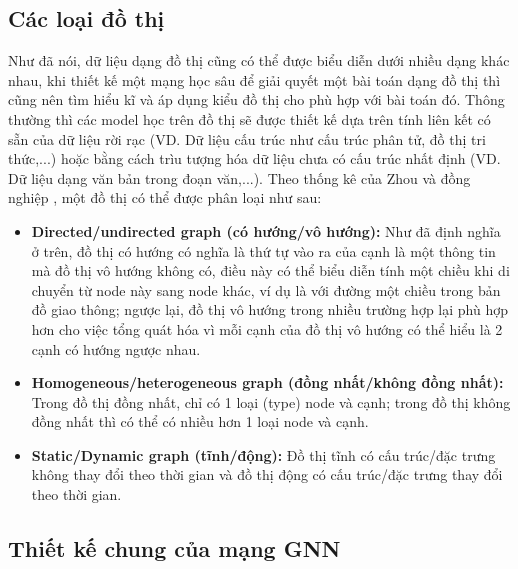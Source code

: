 \subsection{Các loại đồ thị}

\noindent Như đã nói, dữ liệu dạng đồ thị cũng có thể được biểu diễn dưới nhiều dạng khác nhau, khi thiết kế một mạng học sâu để giải quyết một bài toán dạng đồ thị thì cũng nên tìm hiểu kĩ và áp dụng kiểu đồ thị cho phù hợp với bài toán đó. Thông thường thì các model học trên đồ thị sẽ được thiết kế dựa trên tính liên kết có sẵn của dữ liệu rời rạc (VD. Dữ liệu cấu trúc như cấu trúc phân tử, đồ thị tri thức,...) hoặc bằng cách trìu tượng hóa dữ liệu chưa có cấu trúc nhất định (VD. Dữ liệu dạng văn bản trong đoạn văn,...). Theo thống kê của Zhou và đồng nghiệp \cite{review:GNN}, một đồ thị có thể được phân loại như sau:

\begin{itemize}
    \item \textbf{Directed/undirected graph (có hướng/vô hướng):} Như đã định nghĩa ở trên, đồ thị có hướng có nghĩa là thứ tự vào ra của cạnh là một thông tin mà đồ thị vô hướng không có, điều này có thể biểu diễn tính một chiều khi di chuyển từ node này sang node khác, ví dụ là với đường một chiều trong bản đồ giao thông; ngược lại, đồ thị vô hướng trong nhiều trường hợp lại phù hợp hơn cho việc tổng quát hóa vì mỗi cạnh của đồ thị vô hướng có thể hiểu là 2 cạnh có hướng ngược nhau.
    
    \item \textbf{Homogeneous/heterogeneous graph (đồng nhất/không đồng nhất):} Trong đồ thị đồng nhất, chỉ có 1 loại (type) node và cạnh; trong đồ thị không đồng nhất thì có thể có nhiều hơn 1 loại node và cạnh.
    
    \item \textbf{Static/Dynamic graph (tĩnh/động):} Đồ thị tĩnh có cấu trúc/đặc trưng không thay đổi theo thời gian và đồ thị động có cấu trúc/đặc trưng thay đổi theo thời gian.
\end{itemize}

\subsection{Thiết kế chung của mạng GNN} \label{2.2.3-GNN-design}
